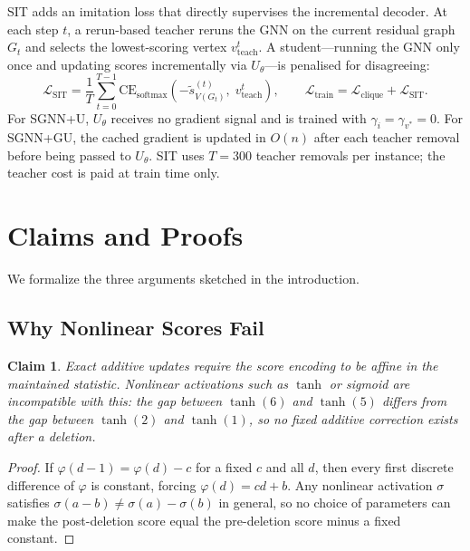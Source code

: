 \documentclass[journal,article,submit,pdftex,moreauthors]{Definitions/mdpi}
\newtheorem{claim}{Claim}[section]
\begin{document}
SIT adds an imitation loss that directly supervises the incremental decoder. At each
step $t$, a rerun-based teacher reruns the GNN on the current residual graph $G_t$
and selects the lowest-scoring vertex $v^t_{\mathrm{teach}}$. A student---running
the GNN only once and updating scores incrementally via $U_\theta$---is penalised
for disagreeing:
\begin{equation}
  \mathcal{L}_{\mathrm{SIT}} = \frac{1}{T} \sum_{t=0}^{T-1}
  \mathrm{CE}_{\mathrm{softmax}}\!\left(-\tilde{s}^{(t)}_{V(G_t)},\;
  v^t_{\mathrm{teach}}\right),
  \qquad
  \mathcal{L}_{\mathrm{train}} = \mathcal{L}_{\mathrm{clique}} +
  \mathcal{L}_{\mathrm{SIT}}.
  \label{eq:sit_loss}
\end{equation}
For SGNN+U, $U_\theta$ receives no gradient signal and is trained with
$\gamma_i = \gamma_{v^*} = 0$. For SGNN+GU, the cached gradient is updated in
$O(n)$ after each teacher removal before being passed to $U_\theta$. SIT uses
$T=300$ teacher removals per instance; the teacher cost is paid at train time only.

\section{Claims and Proofs}
\label{sec:theory}

We formalize the three arguments sketched in the introduction.

\subsection{Why Nonlinear Scores Fail}

\begin{claim}
  Exact additive updates require the score encoding to be affine in the maintained
  statistic. Nonlinear activations such as $\tanh$ or sigmoid are incompatible with
  this: the gap between $\tanh(6)$ and $\tanh(5)$ differs from the gap between
  $\tanh(2)$ and $\tanh(1)$, so no fixed additive correction exists after a
  deletion.
\end{claim}
\begin{proof}
  If $\varphi(d-1) = \varphi(d) - c$ for a fixed $c$ and all $d$, then every first
  discrete difference of $\varphi$ is constant, forcing $\varphi(d) = cd + b$. Any
  nonlinear activation $\sigma$ satisfies $\sigma(a-b) \neq \sigma(a) - \sigma(b)$
  in general, so no choice of parameters can make the post-deletion score equal the
  pre-deletion score minus a fixed constant.
\end{proof}
\end{document}
